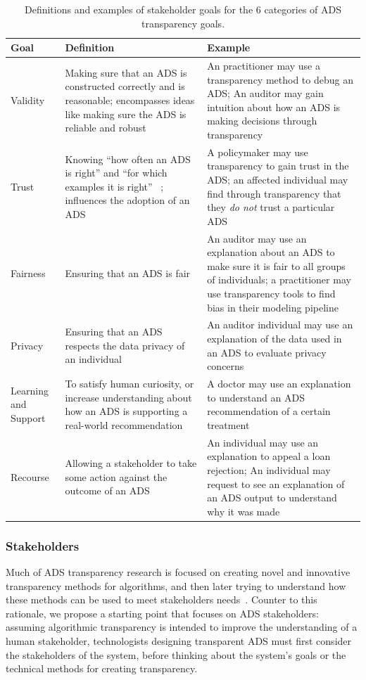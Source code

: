 \begin{table}[t]
\centering 
\begin{tabular}{p{}p{}p{}}
\toprule
\bf{Goal} & \bf{Definition} & \bf{Example} \\ \midrule
Validity & Making sure that an ADS is constructed correctly and is reasonable;  encompasses ideas like making sure the ADS is reliable and robust ~\cite{doshi2017towards} & An practitioner may use a transparency method to debug an ADS; An auditor may gain intuition about how an ADS is making decisions through transparency \\
Trust & Knowing ``how often an ADS is right'' and ``for which examples it is right'' ~\cite{lipton2018mythos}; influences the adoption of an ADS ~\cite{rodolfa2020machine} & A policymaker may use transparency to gain trust in the ADS; an affected individual may find through transparency that they \emph{do not} trust a particular ADS~\cite{schmidt2020transparency} \\
Fairness & Ensuring that an ADS is fair & An auditor may use an explanation about an ADS to make sure it is fair to all groups of individuals; a practitioner may use transparency tools to find bias in their modeling pipeline \\
Privacy & Ensuring that an ADS respects the data privacy of an individual & An auditor individual may use an explanation of the data used in an ADS to evaluate privacy concerns \\ 
Learning and Support &  To satisfy human curiosity, or increase understanding about how an ADS is supporting a real-world recommendation~\cite{rodolfa2020machine, molnar2019} & A doctor may use an explanation to understand an ADS recommendation of a certain treatment \\
Recourse & Allowing a stakeholder to take some action against the outcome of an ADS ~\cite{bhatt2020explainable, rodolfa2020machine} & An individual may use an explanation to appeal a loan rejection; An individual may request to see an explanation of an ADS output to understand why it was made \\
\bottomrule
\end{tabular}
\caption{Definitions and examples of stakeholder goals for the 6 categories of ADS transparency goals.}
\label{tab:goals}
\end{table}

\subsubsection{Stakeholders} Much of ADS transparency research is focused on creating novel and innovative transparency methods for algorithms, and then later trying to understand how these methods can be used to meet stakeholders needs~\cite{bhatt2020explainable, preece2018stakeholders}. Counter to this rationale, we propose a starting point that focuses on ADS stakeholders: assuming algorithmic transparency is intended to improve the understanding of a human stakeholder, technologists designing transparent ADS must first consider the stakeholders of the system, before thinking about the system's goals or the technical methods for creating transparency.

